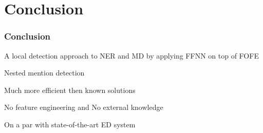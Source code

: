 \documentclass{beamer}
\begin{document}



\section{Conclusion}
\begin{frame}
\frametitle{Conclusion}
\begin{block}{}
	A local detection approach to NER and MD by applying FFNN on top of FOFE
\end{block}
\begin{block}{}
	Nested mention detection
\end{block}
\begin{block}{}
	Much more efficient then known solutions
\end{block}
\begin{block}{}
	No feature engineering and No external knowledge
\end{block}
\begin{block}{}
	On a par with state-of-the-art ED system
\end{block}
\end{frame}
\end{document}
